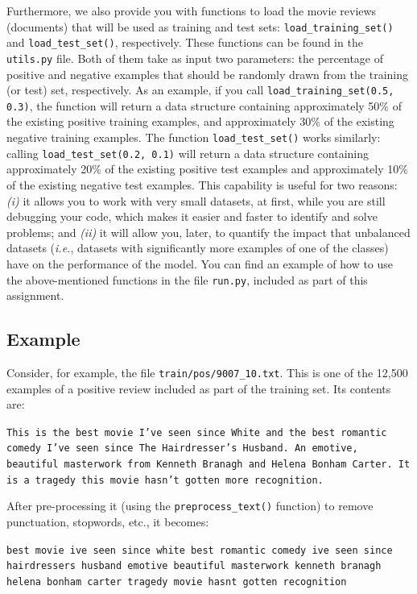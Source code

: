 \documentclass[letterpaper]{article}
\begin{document}
Furthermore, we also provide you with functions to load the movie reviews (documents) that will be used as training and test sets: \texttt{load\_training\_set()} and \texttt{load\_test\_set()}, respectively. These functions can be found in the \texttt{utils.py} file. Both of them take as input two parameters: the percentage of positive and negative examples that should be randomly drawn from the training (or test) set, respectively. As an example, if you call \texttt{load\_training\_set(0.5, 0.3)}, the function will return a data structure containing approximately 50\% of the existing positive training examples, and approximately 30\% of the existing negative training examples. The function \texttt{load\_test\_set()} works similarly: calling \texttt{load\_test\_set(0.2, 0.1)} will return a data structure containing approximately 20\% of the existing positive test examples and approximately 10\% of the existing negative test examples. This capability is useful for two reasons: \textit{(i)} it allows you to work with very small datasets, at first, while you are still debugging your code, which makes it easier and faster to identify and solve problems; and \textit{(ii)} it will allow you, later, to quantify the impact that unbalanced datasets (\textit{i.e.}, datasets with significantly more examples of one of the classes) have on the performance of the model. You can find an example of how to use the  above-mentioned functions in the file \texttt{run.py}, included as part of this assignment.

\subsection{Example}

Consider, for example, the file \texttt{train/pos/9007\_10.txt}. This is one of the 12,500 examples of a positive review included as part of the training set. Its contents are:

\noindent \texttt{This is the best movie I've seen since White and the best romantic comedy I've seen since The Hairdresser's Husband. An emotive, beautiful masterwork from Kenneth Branagh and Helena Bonham Carter. It is a tragedy this movie hasn't gotten more recognition.}

After pre-processing it (using the \texttt{preprocess\_text()} function) to remove punctuation, stopwords, etc., it becomes:

\noindent \texttt{best movie ive seen since white best romantic comedy ive seen since hairdressers husband emotive beautiful masterwork kenneth branagh helena bonham carter tragedy movie hasnt gotten recognition}
\end{document}
